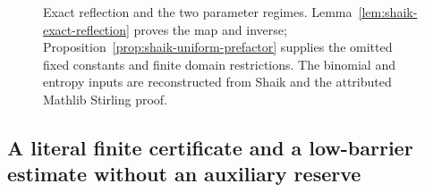 \documentclass[11pt]{article}
\theoremstyle{remark}\newtheorem{remark}[proposition]{Remark}
\begin{document}
\begin{figure}[ht]
\centering
{}
\caption{Exact reflection and the two parameter regimes.
Lemma~\ref{lem:shaik-exact-reflection} proves the map and inverse;
Proposition~\ref{prop:shaik-uniform-prefactor} supplies the omitted
fixed constants and finite domain restrictions. The binomial and
entropy inputs are reconstructed from Shaik \cite{Shaik2026v324}
and the attributed Mathlib Stirling proof.}
\end{figure}

\subsection{A literal finite certificate and a low-barrier estimate without an auxiliary reserve}
\end{document}
